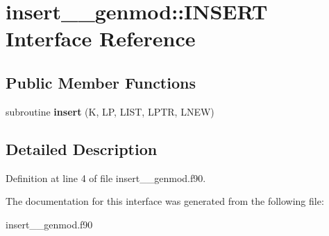 \hypertarget{interfaceinsert____genmod_1_1_i_n_s_e_r_t}{\section{insert\+\_\+\+\_\+genmod\+:\+:I\+N\+S\+E\+R\+T Interface Reference}
\label{interfaceinsert____genmod_1_1_i_n_s_e_r_t}
}
\subsection*{Public Member Functions}
\begin{DoxyCompactItemize}
\item 
\hypertarget{interfaceinsert____genmod_1_1_i_n_s_e_r_t_aee7094aea978479dcf359e280cd9052b}{subroutine {\bfseries insert} (K, L\+P, L\+I\+S\+T, L\+P\+T\+R, L\+N\+E\+W)}\label{interfaceinsert____genmod_1_1_i_n_s_e_r_t_aee7094aea978479dcf359e280cd9052b}

\end{DoxyCompactItemize}


\subsection{Detailed Description}


Definition at line 4 of file insert\+\_\+\+\_\+genmod.\+f90.



The documentation for this interface was generated from the following file\+:\begin{DoxyCompactItemize}
\item 
insert\+\_\+\+\_\+genmod.\+f90\end{DoxyCompactItemize}
